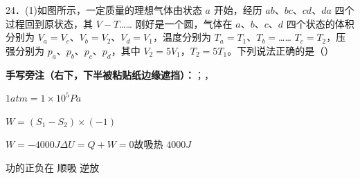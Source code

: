 \begin{problem}[粘贴印刷题 24(1)]
24．(1)如图所示，一定质量的理想气体由状态 $a$ 开始，经历 $ab$、$bc$、$cd$、$da$ 四个过程回到原状态，其 $V-T$……%
刚好是一个圆，气体在 $a$、$b$、$c$、$d$ 四个状态的体积分别为 $V_a=V_c$、$V_b=V_2$、$V_d=V_1$，温度分别为 $T_a=T_1$、$T_b=$……%
$T_c=T_2$，压强分别为 $p_a$、$p_b$、$p_c$、$p_d$，其中 $V_2=5V_1$，$T_2=5T_1$。下列说法正确的是（\qquad）

\medskip
\noindent\textbf{手写旁注（右下，下半被粘贴纸边缘遮挡）：}；，%
\end{problem}
\begin{problem}
\begin{solution}
$1\unit{atm}=1\times10^5\unit{Pa}$

$W=$$(S_1-S_2)\times(-1)$ %

$W=-4000\unit{J}$\quad $\Delta U=Q+W=0$\quad 故吸热 $4000\unit{J}$
\end{solution}
\end{problem}
功的正负\quad 在 顺吸 逆放
